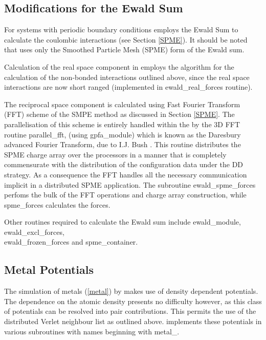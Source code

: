 \subsection{Modifications for the Ewald Sum}

For systems with periodic boundary conditions \D employs the Ewald
Sum to calculate the coulombic interactions
(see Section \ref{SPME}).  It should be noted that \D uses only the
Smoothed Particle Mesh (SPME) form of the Ewald sum.

Calculation of the real space component in \D employs the
algorithm for the calculation of the non-bonded interactions
outlined above, since the real space interactions are now short
ranged (implemented in {\sc ewald\_real\_forces} routine).

The reciprocal space component is calculated using Fast Fourier
Transform (FFT) scheme of the SMPE method \cite{essmann-95a,bush-06a} as
discussed in Section \ref{SPME}.  The parallelisation of this scheme is
entirely handled within the \D by the 3D FFT routine {\sc parallel\_fft},
(using {\sc gpfa\_module}) which is known as the Daresbury advanced
Fourier Transform, due to I.J. Bush \cite{bush-00a}.  This routine
distributes the SPME charge array over the processors in a manner
that is completely commensurate with the distribution of the
configuration data under the DD strategy.  As a consequence the
FFT handles all the necessary communication implicit in a
distributed SPME application.  The \D subroutine {\sc ewald\_spme\_forces}
perfoms the bulk of the FFT operations and charge array construction,
while {\sc spme\_forces} calculates the forces.

Other routines required to calculate the Ewald sum include {\sc ewald\_module}, \\
{\sc ewald\_excl\_forces}, \\ {\sc ewald\_frozen\_forces} and {\sc spme\_container}.

\subsection{Metal Potentials}

The simulation of metals (\ref{metal}) by \D makes use of density
dependent potentials.  The dependence on the atomic density presents
no difficulty however, as this class of potentials can be resolved
into pair contributions.  This permits the use of the distributed
Verlet neighbour list as
outlined above.  \D implements these potentials in various
subroutines with names beginning with {\sc metal\_}.


